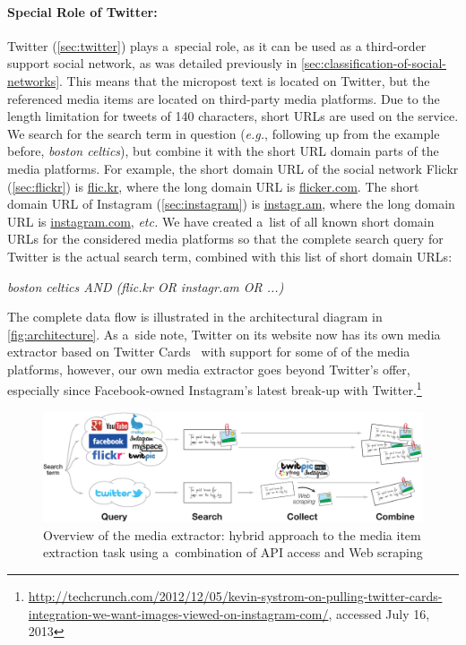 \paragraph{Special Role of Twitter:}

Twitter (\autoref{sec:twitter})
plays a~special role, as it can be used as
a third-order support social network,
as was detailed previously in \autoref{sec:classification-of-social-networks}.
This means that the micropost text is located on Twitter,
but the referenced media items are located
on third-party media platforms.
Due to the length limitation for tweets of 140 characters,
short URLs are used on the service.
We search for the search term in question (\emph{e.g.},
following up from the example before, \emph{boston celtics}),
but combine it with the short URL domain parts of
the media platforms.
For example, the short domain URL of the social network Flickr 
(\autoref{sec:flickr})
is \url{flic.kr}, where the long domain URL is \url{flicker.com}.
The short domain URL of Instagram 
(\autoref{sec:instagram}) is \url{instagr.am},
where the long domain URL is \url{instagram.com}, \emph{etc.}
We have created a~list of all known short domain URLs for the 
considered media platforms so that the complete search query
for Twitter is the actual search term,
combined with this list of short domain URLs:

\emph{boston celtics AND (flic.kr OR instagr.am OR ...)}

\noindent The complete data flow is illustrated in the
architectural diagram in \autoref{fig:architecture}.
As a~side note, Twitter on its website now has its own
media extractor based on Twitter Cards~\cite{wang2012twitter}
with support for some of of the media platforms,
however, our own media extractor goes beyond Twitter's offer,
especially since Facebook-owned Instagram's latest break-up with
Twitter.\footnote{\url{http://techcrunch.com/2012/12/05/kevin-systrom-on-pulling-twitter-cards-integration-we-want-images-viewed-on-instagram-com/}, accessed July 16, 2013}

\begin{figure}
  \centering
  \includegraphics[width=1.0\linewidth]{architecture.pdf}
  \caption[Overview of the media extractor]
    {Overview of the media extractor:
    hybrid approach to the media item extraction task using
    a~combination of API access and Web scraping}
  \label{fig:architecture}
\end{figure}

